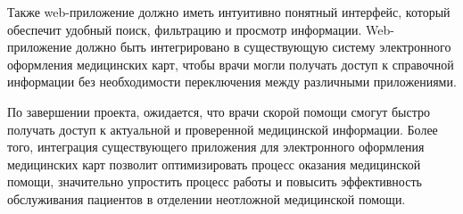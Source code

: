 Также web-приложение должно иметь интуитивно понятный интерфейс, который обеспечит удобный поиск, фильтрацию и просмотр информации. Web-приложение должно быть интегрировано в существующую систему электронного оформления медицинских карт, чтобы врачи могли получать доступ к справочной информации без необходимости переключения между различными приложениями.

По завершении проекта, ожидается, что врачи скорой помощи смогут быстро получать доступ к актуальной и проверенной медицинской информации. Более того, интеграция существующего приложения для электронного оформления медицинских карт позволит оптимизировать процесс оказания медицинской помощи, значительно упростить процесс работы и повысить эффективность обслуживания пациентов в отделении неотложной медицинской помощи.
